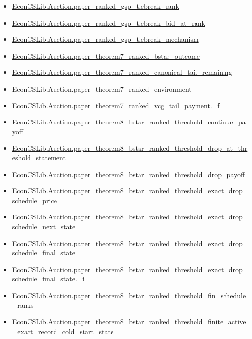 \documentclass[10pt]{article}
\begin{document}
\begin{itemize}[leftmargin=1.2em]
\begin{itemize}[leftmargin=1.2em]
\item \hyperlink{library-prerequisite-ec60222932ae7492}{EconCSLib.Auction.paper\_ranked\_gsp\_tiebreak\_rank}
\item \hyperlink{library-prerequisite-83676bb7cf4ba4f6}{EconCSLib.Auction.paper\_ranked\_gsp\_tiebreak\_bid\_at\_rank}
\item \hyperlink{library-prerequisite-5b325da3a7a39206}{EconCSLib.Auction.paper\_ranked\_gsp\_tiebreak\_mechanism}
\item \hyperlink{library-prerequisite-216cf1464f29e423}{EconCSLib.Auction.paper\_theorem7\_ranked\_bstar\_outcome}
\item \hyperlink{library-prerequisite-b86920def5dd7f78}{EconCSLib.Auction.paper\_theorem7\_ranked\_canonical\_tail\_remaining}
\item \hyperlink{library-prerequisite-bba55f1b71c1375b}{EconCSLib.Auction.paper\_theorem7\_ranked\_environment}
\item \hyperlink{library-prerequisite-a47a0a548feef9f2}{EconCSLib.Auction.paper\_theorem7\_ranked\_vcg\_tail\_payment.\_f}
\item \hyperlink{library-prerequisite-71290fc5ffaa5b48}{EconCSLib.Auction.paper\_theorem8\_bstar\_ranked\_threshold\_continue\_payoff}
\item \hyperlink{library-prerequisite-31829e405a64917b}{EconCSLib.Auction.paper\_theorem8\_bstar\_ranked\_threshold\_drop\_at\_threshold\_statement}
\item \hyperlink{library-prerequisite-0941048da8d87b32}{EconCSLib.Auction.paper\_theorem8\_bstar\_ranked\_threshold\_drop\_payoff}
\item \hyperlink{library-prerequisite-41b13fd69b3db64c}{EconCSLib.Auction.paper\_theorem8\_bstar\_ranked\_threshold\_exact\_drop\_schedule\_price}
\item \hyperlink{library-prerequisite-b78d23cb46182c7d}{EconCSLib.Auction.paper\_theorem8\_bstar\_ranked\_threshold\_exact\_drop\_schedule\_next\_state}
\item \hyperlink{library-prerequisite-a59c17bee5b719d1}{EconCSLib.Auction.paper\_theorem8\_bstar\_ranked\_threshold\_exact\_drop\_schedule\_final\_state}
\item \hyperlink{library-prerequisite-f0d5127d1e38bcc3}{EconCSLib.Auction.paper\_theorem8\_bstar\_ranked\_threshold\_exact\_drop\_schedule\_final\_state.\_f}
\item \hyperlink{library-prerequisite-9ce82deeac775ddf}{EconCSLib.Auction.paper\_theorem8\_bstar\_ranked\_threshold\_fin\_schedule\_ranks}
\item \hyperlink{library-prerequisite-5c083e29eda38d35}{EconCSLib.Auction.paper\_theorem8\_bstar\_ranked\_threshold\_finite\_active\_exact\_record\_cold\_start\_state}

\end{itemize}
\end{itemize}
\end{document}
